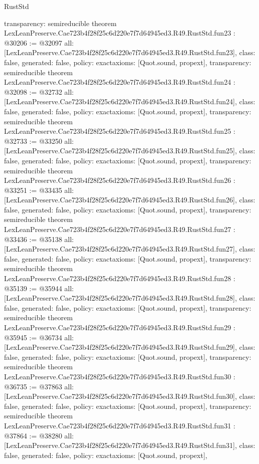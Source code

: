 \begin{lexlean}{RustStd}
\begin{coremodule}
{  transparency: semireducible
}
theorem LexLeanPreserve.Cae723b4f28f25c6d220e7f7d64945ed3.R49.RustStd.fun23 : @30206 := @32097 {
  all: [LexLeanPreserve.Cae723b4f28f25c6d220e7f7d64945ed3.R49.RustStd.fun23],
  class: false,
  generated: false,
  policy: exact{axioms: [Quot.sound, propext]},
  transparency: semireducible
}
theorem LexLeanPreserve.Cae723b4f28f25c6d220e7f7d64945ed3.R49.RustStd.fun24 : @32098 := @32732 {
  all: [LexLeanPreserve.Cae723b4f28f25c6d220e7f7d64945ed3.R49.RustStd.fun24],
  class: false,
  generated: false,
  policy: exact{axioms: [Quot.sound, propext]},
  transparency: semireducible
}
theorem LexLeanPreserve.Cae723b4f28f25c6d220e7f7d64945ed3.R49.RustStd.fun25 : @32733 := @33250 {
  all: [LexLeanPreserve.Cae723b4f28f25c6d220e7f7d64945ed3.R49.RustStd.fun25],
  class: false,
  generated: false,
  policy: exact{axioms: [Quot.sound, propext]},
  transparency: semireducible
}
theorem LexLeanPreserve.Cae723b4f28f25c6d220e7f7d64945ed3.R49.RustStd.fun26 : @33251 := @33435 {
  all: [LexLeanPreserve.Cae723b4f28f25c6d220e7f7d64945ed3.R49.RustStd.fun26],
  class: false,
  generated: false,
  policy: exact{axioms: [Quot.sound, propext]},
  transparency: semireducible
}
theorem LexLeanPreserve.Cae723b4f28f25c6d220e7f7d64945ed3.R49.RustStd.fun27 : @33436 := @35138 {
  all: [LexLeanPreserve.Cae723b4f28f25c6d220e7f7d64945ed3.R49.RustStd.fun27],
  class: false,
  generated: false,
  policy: exact{axioms: [Quot.sound, propext]},
  transparency: semireducible
}
theorem LexLeanPreserve.Cae723b4f28f25c6d220e7f7d64945ed3.R49.RustStd.fun28 : @35139 := @35944 {
  all: [LexLeanPreserve.Cae723b4f28f25c6d220e7f7d64945ed3.R49.RustStd.fun28],
  class: false,
  generated: false,
  policy: exact{axioms: [Quot.sound, propext]},
  transparency: semireducible
}
theorem LexLeanPreserve.Cae723b4f28f25c6d220e7f7d64945ed3.R49.RustStd.fun29 : @35945 := @36734 {
  all: [LexLeanPreserve.Cae723b4f28f25c6d220e7f7d64945ed3.R49.RustStd.fun29],
  class: false,
  generated: false,
  policy: exact{axioms: [Quot.sound, propext]},
  transparency: semireducible
}
theorem LexLeanPreserve.Cae723b4f28f25c6d220e7f7d64945ed3.R49.RustStd.fun30 : @36735 := @37863 {
  all: [LexLeanPreserve.Cae723b4f28f25c6d220e7f7d64945ed3.R49.RustStd.fun30],
  class: false,
  generated: false,
  policy: exact{axioms: [Quot.sound, propext]},
  transparency: semireducible
}
theorem LexLeanPreserve.Cae723b4f28f25c6d220e7f7d64945ed3.R49.RustStd.fun31 : @37864 := @38280 {
  all: [LexLeanPreserve.Cae723b4f28f25c6d220e7f7d64945ed3.R49.RustStd.fun31],
  class: false,
  generated: false,
  policy: exact{axioms: [Quot.sound, propext]},
}
\end{coremodule}
\end{lexlean}
